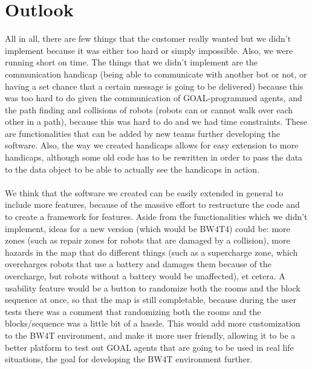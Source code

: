 \documentclass[]{article}
\begin{document}
\section*{Outlook}
All in all, there are few things that the customer really wanted but we didn't implement because it was either too hard or simply impossible. Also, we were running short on time. The things that we didn't implement are the communication handicap (being able to communicate with another bot or not, or having a set chance that a certain message is going to be delivered) because this was too hard to do given the communication of GOAL-programmed agents, and the path finding and collisions of robots (robots can or cannot walk over each other in a path), because this was hard to do and we had time constraints. These are functionalities that can be added by new teams further developing the software. Also, the way we created handicaps allows for easy extension to more handicaps, although some old code has to be rewritten in order to pass the data to the data object to be able to actually see the handicaps in action. \\
\\
We think that the software we created can be easily extended in general to include more features, because of the massive effort to restructure the code and to create a framework for features. Aside from the functionalities which we didn't implement, ideas for a new version (which would be BW4T4) could be: more zones (such as repair zones for robots that are damaged by a collision), more hazards in the map that do different things (such as a supercharge zone, which overcharges robots that use a battery and damages them because of the overcharge, but robots without a battery would be unaffected), et cetera. A usability feature would be a button to randomize both the rooms and the block sequence at once, so that the map is still completable, because during the user tests there was a comment that randomizing both the rooms and the blocks/sequence was a little bit of a hassle. This would add more customization to the BW4T environment, and make it more user friendly, allowing it to be a better platform to test out GOAL agents that are going to be used in real life situations, the goal for developing the BW4T environment further. \\
\\
\end{document}

